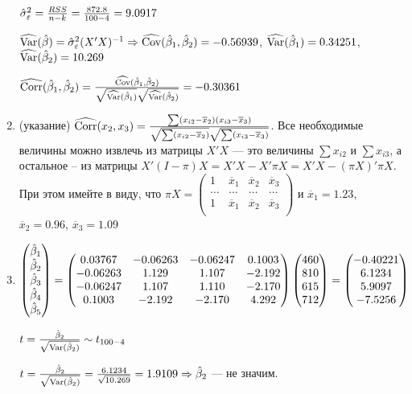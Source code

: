 \begin{problem}
\begin{sol}
\begin{enumerate}
$\hat{\sigma}_{\varepsilon}^2 = \frac{RSS}{n-k} = \frac{872.8}{100-4} = 9.0917$

$\widehat{\operatorname{Var}}(\hat{\beta}) = \hat{\sigma}_{\varepsilon}^2 (X' X)^{-1} \Rightarrow \widehat{\operatorname{Cov}}(\hat{\beta}_1, \hat{\beta}_2) = -0.56939$, $\widehat{\operatorname{Var}}(\hat{\beta}_1) = 0.34251$, $\widehat{\operatorname{Var}}(\hat{\beta}_2) = 10.269$

$\widehat{\operatorname{Corr}}(\hat{\beta}_1, \hat{\beta}_2) = \frac{\widehat{\operatorname{Cov}}(\hat{\beta}_1, \hat{\beta}_2)}{\sqrt{\widehat{\operatorname{Var}}(\hat{\beta}_1)}\sqrt{\widehat{\operatorname{Var}}(\hat{\beta}_2)}} = -0.30361$

\item(указание) $\widehat{\operatorname{Corr}}(x_2, x_3) = \frac{\sum (x_{i2} - \overline{x}_2) (x_{i3} - \overline{x}_3)}{\sqrt{\sum (x_{i2} - \overline{x}_2)}\sqrt{\sum (x_{i3} - \overline{x}_3)}}$. Все необходимые величины можно извлечь из матрицы $X' X$ — это величины $\sum x_{i2}$ и $\sum x_{i3}$, а остальное -- из матрицы $X' (I - \pi) X = X' X - X' \pi X = X' X - (\pi X)' \pi X$. При этом имейте в виду, что
$\pi X = \begin{pmatrix}
1 & \overline{x}_1 & \overline{x}_2 & \overline{x}_3 \\
\ldots & \ldots & \ldots & \ldots \\
1 & \overline{x}_1 & \overline{x}_2 & \overline{x}_3 \\
\end{pmatrix}$ и $\overline{x}_1 = 1.23$, $\overline{x}_2 = 0.96$, $\overline{x}_3 = 1.09$

\item $\begin{pmatrix}
\hat{\beta}_1 \\
\hat{\beta}_2 \\
\hat{\beta}_3 \\
\hat{\beta}_4 \\
\hat{\beta}_5 \\
\end{pmatrix} = \begin{pmatrix}
0.03767 & -0.06263 & -0.06247 & 0.1003 \\
-0.06263 & 1.129 & 1.107 & -2.192 \\
-0.06247 & 1.107 & 1.110 & -2.170 \\
0.1003 & -2.192 & -2.170 & 4.292 \\
\end{pmatrix} \begin{pmatrix}
460\\
810\\
615\\
712\\
\end{pmatrix} = \begin{pmatrix}
-0.40221 \\
6.1234 \\
5.9097 \\
-7.5256 \\
\end{pmatrix}$

$t = \frac{\hat{\beta}_2}{\sqrt{\operatorname{Var}(\hat{\beta}_2)}} \sim t_{100-4}$

$t = \frac{\hat{\beta}_2}{\sqrt{\operatorname{Var}(\hat{\beta}_2)}} = \frac{6.1234}{\sqrt{10.269}} = 1.9109 \Rightarrow \hat{\beta}_2$ — не значим.
\end{enumerate}
\end{sol}
\end{problem}




